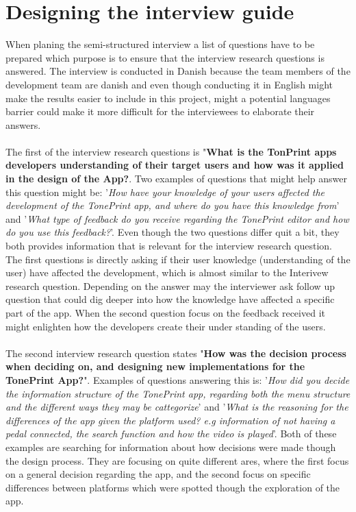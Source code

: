 \section{Designing the interview guide}
\label{InterviewGuide}
When planing the semi-structured interview a list of questions have to be prepared which purpose is to ensure that the interview research questions is answered. The interview is conducted in Danish because the team members of the development team are danish and even though conducting it in English might make the results easier to include in this project, might a potential languages barrier could make it more difficult for the interviewees to elaborate their answers. \\
\\
The first of the interview research questions is "\textbf{What is the TonPrint apps developers understanding of their target users and how was it applied in the design of the App?}. Two examples of questions that might help answer this question might be: '\textit{How have your knowledge of your users affected the development of the TonePrint app, and where do you have this knowledge from}' and '\textit{What type of feedback do you receive regarding the TonePrint editor and how do you use this feedback?}'. Even though the two questions differ quit a bit, they both provides information that is relevant for the interview research question. The first questions is directly asking if their user knowledge (understanding of the user) have affected the development, which is almost similar to the Interivew research question. Depending on the answer may the interviewer ask follow up question that could dig deeper into how the knowledge have affected a specific part of the app. When the second question focus on the feedback received it might enlighten how the developers create their under standing of the users.\\
\\
The second interview research question states "\textbf{How was the decision process when deciding on, and designing new implementations for the TonePrint App?}". Examples of questions answering this is: '\textit{How did you decide the information structure of the TonePrint app, regarding both the menu structure and the different ways they may be cattegorize}' and '\textit{What is the reasoning for the differences of the app given the platform used? e.g information of not having a pedal connected, the search function and how the video is played}'. Both of these examples are searching for information about how decisions were made though the design process. They are focusing on quite different ares, where the first focus on a general decision regarding the app, and the second focus on specific differences between platforms which were spotted though the exploration of the app. \\
